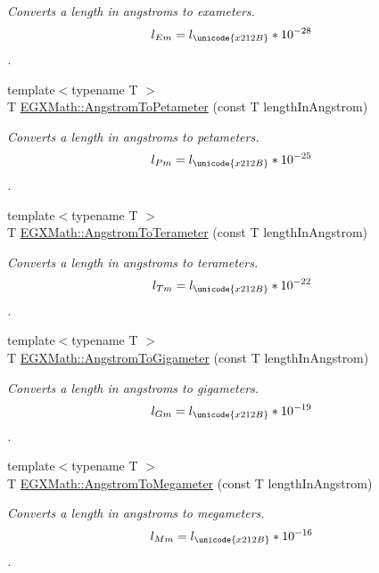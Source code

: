 \begin{DoxyCompactItemize}
\begin{DoxyCompactList}\small\item\em Converts a length in angstroms to exameters. \[ l_{Em}=l_{\unicode{x212B}} * 10^{-28} \]. \end{DoxyCompactList}\item 
{\footnotesize template$<$typename T $>$ }\\T \mbox{\hyperlink{group___e_g_x_math-_conversions-_length_conversions-_non-_s_i-_angstrom-_s_i_gafef0064a5934d807bed8bc6e8c9dd048}{E\+G\+X\+Math\+::\+Angstrom\+To\+Petameter}} (const T length\+In\+Angstrom)
\begin{DoxyCompactList}\small\item\em Converts a length in angstroms to petameters. \[ l_{Pm}=l_{\unicode{x212B}} * 10^{-25} \]. \end{DoxyCompactList}\item 
{\footnotesize template$<$typename T $>$ }\\T \mbox{\hyperlink{group___e_g_x_math-_conversions-_length_conversions-_non-_s_i-_angstrom-_s_i_ga4571315b1da0976784c024a676ebfa43}{E\+G\+X\+Math\+::\+Angstrom\+To\+Terameter}} (const T length\+In\+Angstrom)
\begin{DoxyCompactList}\small\item\em Converts a length in angstroms to terameters. \[ l_{Tm}=l_{\unicode{x212B}} * 10^{-22} \]. \end{DoxyCompactList}\item 
{\footnotesize template$<$typename T $>$ }\\T \mbox{\hyperlink{group___e_g_x_math-_conversions-_length_conversions-_non-_s_i-_angstrom-_s_i_ga4f2ea6df8f1d3bb9dd787d97f8edc64d}{E\+G\+X\+Math\+::\+Angstrom\+To\+Gigameter}} (const T length\+In\+Angstrom)
\begin{DoxyCompactList}\small\item\em Converts a length in angstroms to gigameters. \[ l_{Gm}=l_{\unicode{x212B}} * 10^{-19} \]. \end{DoxyCompactList}\item 
{\footnotesize template$<$typename T $>$ }\\T \mbox{\hyperlink{group___e_g_x_math-_conversions-_length_conversions-_non-_s_i-_angstrom-_s_i_gae00a8e1d268242cc622c91e84f06f442}{E\+G\+X\+Math\+::\+Angstrom\+To\+Megameter}} (const T length\+In\+Angstrom)
\begin{DoxyCompactList}\small\item\em Converts a length in angstroms to megameters. \[ l_{Mm}=l_{\unicode{x212B}} * 10^{-16} \]. \end{DoxyCompactList}\item 

\end{DoxyCompactItemize}
